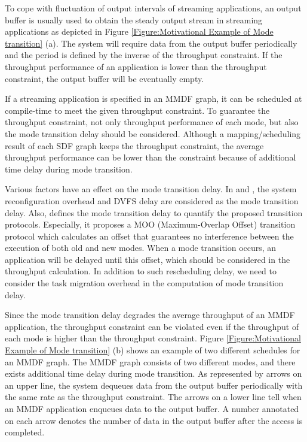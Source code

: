 \documentclass[prodmode,acmtecs]{acmsmall}
\begin{document}
To cope with fluctuation of output intervals of streaming applications, an output buffer is usually used to obtain the steady output stream in streaming applications as depicted in Figure \ref{Figure:Motivational Example of Mode transition} (a). The system will require data from the output buffer periodically and the period is defined by the inverse of the throughput constraint. If the throughput performance of an application is lower than the throughput constraint, the output buffer will be eventually empty.

If a streaming application is specified in an MMDF graph, it can be scheduled at compile-time to meet the given throughput constraint. To guarantee the throughput constraint, not only throughput performance of each mode, but also the mode transition delay should be considered. Although a mapping/scheduling result of each SDF graph keeps the throughput constraint, the average throughput performance can be lower than the constraint because of additional time delay during mode transition.

Various factors have an effect on the mode transition delay. In \cite{Stuijk:2010} and \cite{Geilen:2012}, the system reconfiguration overhead and DVFS delay are considered as the mode transition delay. Also, \cite{Zhai:2015} defines the mode transition delay to quantify the proposed transition protocols. Especially, it proposes a MOO (Maximum-Overlap Offset) transition protocol which calculates an offset that guarantees no interference between the execution of both old and new modes. When a mode transition occurs, an application will be delayed until this offset, which should be considered in the throughput calculation. In addition to such rescheduling delay, we need to consider the task migration overhead in the computation of mode transition delay.

Since the mode transition delay degrades the average throughput of an MMDF application, the throughput constraint can be violated even if the throughput of each mode is higher than the throughput constraint. Figure \ref{Figure:Motivational Example of Mode transition} (b) shows an example of two different schedules for an MMDF graph. The MMDF graph consists of two different modes, and there exists additional time delay during mode transition. As represented by arrows on an upper line, the system dequeues data from the output buffer periodically with the same rate as the throughput constraint. The arrows on a lower line tell when an MMDF application enqueues data to the output buffer. A number annotated on each arrow denotes the number of data in the output buffer after the access is completed.
\end{document}
